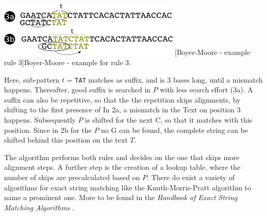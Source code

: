 \begin{itemize}
\begin{minipage}{\linewidth}
    \centering
    \includegraphics[width=0.65\textwidth]{images/boyer3.png}
    [Boyer-Moore - example rule 3]{Boyer-Moore - example for rule 3. }
\label{fig:boyer3}
\end{minipage}
Here, sub-pattern $t$ = \texttt{TAT} matches as suffix, and is 3 bases long, until a mismatch happens. Thereafter, good suffix is searched in $P$ with less search effort (3a). A suffix can also be repetitive, so that the the repetition skips alignments, by shifting to the first presence of In 2a, a mismatch in the Text on position 3 happens. Subsequently $P$ is shifted for the next C, so that it matches with this position. Since in 2b for the $P$ no G can be found, the complete string can be shifted behind this position on the text $T$.
\end{itemize}
The algorithm performs both rules and decides on the one that skips more alignment steps. A further step is the creation of a lookup table, where the number of skips are precalculated based on $P$. There do exist a variety of algorithms for exact string matching like the Knuth-Morris-Pratt algorithm to name a prominent one. More to be found in the \textit{Handbook of Exact String Matching Algorithms} \cite{0954300645}.

